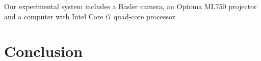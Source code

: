 \documentclass[10pt,letterpaper]{article}
\begin{document}
Our experimental system includes a Basler camera, an Optoma ML750 projector and a computer with Intel Core i7 quad-core processor.



\section{Conclusion}
\end{document}
